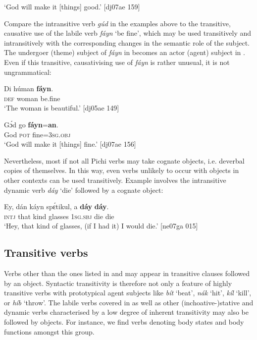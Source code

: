 \glt ‘God will make it [things] good.’ [dj07ae 159]
\z

Compare the intransitive verb \textit{gúd} in the examples above to the transitive, causative use of the labile verb \textit{fáyn} ‘be fine’, which may be used transitively and intransitively with the corresponding changes in the semantic role of the subject. The undergoer (theme) subject of \textit{fáyn} in  becomes an actor (agent) subject in . Even if this transitive, causativising use of \textit{fáyn} is rather unusual, it is not ungrammatical: 


\ea%
    \label{ex:key:1098}
    \gll Di  húman  \textbf{fáyn}.\\
\textsc{def}  woman  be.fine\\

\glt ‘The woman is beautiful.’ [dj05ae 149]
\z


\ea%
    \label{ex:key:1099}
    \gll Gɔ́d    go  \textbf{fáyn}=\textbf{an}.\\
God    \textsc{pot}  fine=\textsc{3sg.obj}\\

\glt ‘God will make it [things] fine.’ [dj07ae 156]
\z

Nevertheless, most if not all Pichi verbs may take cognate objects, i.e. deverbal copies of themselves. In this way, even verbs unlikely to occur with objects in other contexts can be used transitively. Example  involves the intransitive dynamic verb \textit{dáy} ‘die’ followed by a cognate object: 


\ea%
    \label{ex:key:1100}
    \gll Ey,  dán  káyn  spɛ́tikul,  a    \textbf{dáy}  \textbf{dáy}.\\
\textsc{intj}  that  kind    glasses  \textsc{1sg.sbj}  die  die\\

\glt ‘Hey, that kind of glasses, (if I had it) I would die.’ [ne07ga 015]
\z

\subsection{Transitive verbs}

Verbs other than the ones listed in  and  may appear in transitive clauses followed by an object. Syntactic transitivity is therefore not only a feature of highly transitive verbs with prototypical agent subjects like \textit{bít} ‘beat’, \textit{nák} ‘hit’, \textit{kíl} ‘kill’, or \textit{híb} ‘throw’. The labile verbs covered in  as well as other (inchoative-)stative and dynamic verbs characterised by a low degree of inherent transitivity may also be followed by objects. For instance, we find verbs denoting body states and body functions amongst this group.


